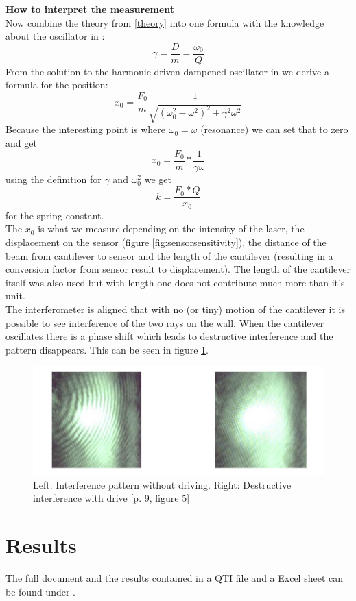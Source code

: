 \documentclass[12pt,a4paper]{article}
\begin{document}
\begin{multicols}{2}
\noindent
\textbf{How to interpret the measurement}\\
Now combine the theory from \ref{theory} into one formula with the knowledge about the oscillator in \cite{physikwiki}:
$$\gamma = \frac{D}{m} = \frac{\omega_0}{Q}$$
From the solution to the harmonic driven dampened oscillator in \cite{physikwiki} we derive a formula for the position:
$$x_0 = \frac{F_0}{m}  \frac{1}{\sqrt{ (\omega_0^2 - \omega^2 )^2 + \gamma^2  \omega^2}}$$
Because the interesting point is where $\omega_0 = \omega$ (resonance) we can set that to zero and get
$$x_0 = \frac{F_0}{m} * \frac{1}{\gamma  \omega}$$
using the definition for $\gamma$ and $\omega_0^2$ we get
$$k = \frac{F_0 * Q}{x_0}$$
for the spring constant.\\
The $x_0$ is what we measure depending on the intensity of the laser, the displacement on the sensor (figure \ref{fig:sensorsensitivity}), the distance of the beam from cantilever to sensor and the length of the cantilever (resulting in a conversion factor from sensor result to displacement). The length of the cantilever itself was also used but with length one does not contribute much more than it's unit.\\

The interferometer is aligned that with no (or tiny) motion of the cantilever it is possible to see interference of the two rays on the wall. When the cantilever oscillates there is a phase shift which leads to destructive interference and the pattern disappears. This can be seen in figure \ref{fig:pattern}.

\begin{figure}[H]
	\centering
	\includegraphics[scale=0.6]{../figures/interference.png}
	\caption{Left: Interference pattern without driving. Right: Destructive interference with drive \cite{physikwiki}[p. 9, figure 5]}
	\label{fig:pattern}
\end{figure}
\section{Results}
The full document and the results contained in a QTI file and a Excel sheet can be found under \cite{github}.


\end{multicols}
\end{document}
